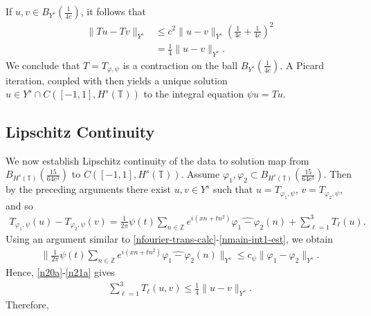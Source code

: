 \documentclass[12pt,reqno]{amsart}
\numberwithin{equation}{section}  %
\newcommand{\zz}{\mathbb{Z}}
\newcommand{\ci}{\mathbb{T}}
\newcommand{\wh}{\widehat}
\newcommand{\vp}{\varphi}
\renewcommand{\cref}{\Cref}
\begin{document}
%
If $u, v \in B_{Y^{s}}(\frac{1}{4c})$, it follows that
%
\begin{equation}
	\label{n21a}
	\begin{split}
		\|Tu - Tv \|_{Y^s}
		& \le c^2 \|u -v \|_{Y^s} \left( \frac{1}{4c} + 
		\frac{1}{4c} \right)^2
		\\
		& = \frac{1}{4} \|u -v \|_{Y^s}. 
	\end{split}
\end{equation}
%
We conclude that $T = T_{\vp, \psi}$ is a contraction on the ball
$B_{Y^{s}}(\frac{1}{4c})$. A Picard iteration, coupled with
\cref{nlem:cutoff-loc-soln} then yields a unique solution $u \in Y^{s} \cap
C(\left[ -1, 1 \right], H^{s}(\ci))$ to the integral equation $\psi u = Tu$.
%
%
%
\subsection{Lipschitz Continuity} 
\label{ssec:lip-cont-flow-map}
We now establish Lipschitz continuity of the data to solution map from
\\ $B_{H^{s}(\ci)}(\frac{15}{64c^{3}})$ to $C(\left[ -1, 1 \right], H^{s}(\ci))$.
Assume $\vp_1, \vp_2
\subset B_{H^s(\ci)}(\frac{15}{64c^{3}})$.
Then by the preceding arguments there exist $u, v \in Y^s$ such that 
$u = T_{\vp_1, \psi}$, $v = T_{\vp_2, \psi}$, and so
%
%
\begin{equation*}
	\begin{split}
		T_{\vp_1, \psi}(u) -
    T_{\vp_2, \psi}(v) = \frac{1}{2\pi} \psi(t) \sum_{n \in
		\zz}e^{i\left( xn + tn^{2} \right)} \wh{\vp_1 - \vp_2}(n) + \sum_{\ell=1
    }^{3} T_{\ell}(u).
	\end{split}
\end{equation*}
%
%
Using an argument similar to \eqref{nfourier-trans-calc}-\eqref{nmain-int1-est},
we obtain
%
%
\begin{equation*}
	\begin{split}
		\| \frac{1}{2\pi} \psi(t) \sum_{n \in
		\zz}e^{i\left( xn + tn^{2} \right)} \wh{\vp_1 - \vp_2}(n)\|_{Y^s}
		\le c_{\psi} \|\vp_{1} - \vp_{2}\|_{Y^s}.
	\end{split}
\end{equation*}
%
%
Hence, \eqref{n20a}-\eqref{n21a} gives
%
%
\begin{equation*}
	\begin{split}
    \sum_{\ell=1}^{3} T_{\ell}(u,v) \le \frac{1}{4}\|u-v\|_{Y^s}.
	\end{split}
\end{equation*}
%
%
Therefore,
\end{document}
